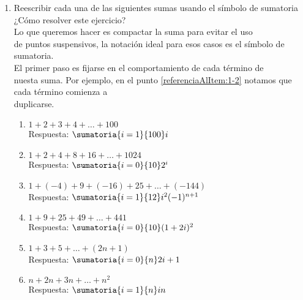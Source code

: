 \ejercicio
\begin{enumerate}[label=\roman*)]
    \item Reescribir cada una de las siguientes sumas usando el símbolo de sumatoria\\ 
    
    ¿Cómo resolver este ejercicio?\\
    Lo que queremos hacer es compactar la suma para evitar el uso\\
    de puntos suspensivos, la notación ideal para esos casos es el símbolo de sumatoria.\\
    El primer paso es fijarse en el comportamiento de cada término de\\
    nuesta suma. Por ejemplo, en el punto \ref{referenciaAlItem:1-2} notamos que cada término comienza a\\
    duplicarse.


    \begin{enumerate}[label=\alph*)] 
        \item  $1 + 2 + 3 + 4 + \dots + 100$\\
        Respuesta: $ \sumatoria{i=1}{100}i $\\

        \item\label{referenciaAlItem:1-2}  $1 + 2 + 4 + 8 + 16 + \dots + 1024$\\
        Respuesta: $ \sumatoria{i=0}{10}2^i $\\

      \item  $1 + (-4) + 9 + (-16) + 25 + \dots + (-144)$\\
        Respuesta: $ \sumatoria{i=1}{12}i^2(-1)^{n+1} $\\

        \item $1 + 9 + 25 + 49 + \dots + 441$\\

        Respuesta: $ \sumatoria{i=0}{10}(1+2i)^2 $\\

        \item $1 + 3 + 5 + \dots + (2n + 1)$\\
        Respuesta: $ \sumatoria{i=0}{n} 2i+1 $\\

        \item $n + 2n + 3n + \dots + n^2$\\
        Respuesta: $ \sumatoria{i=1}{n} in $\\
    \end{enumerate}


\end{enumerate}
